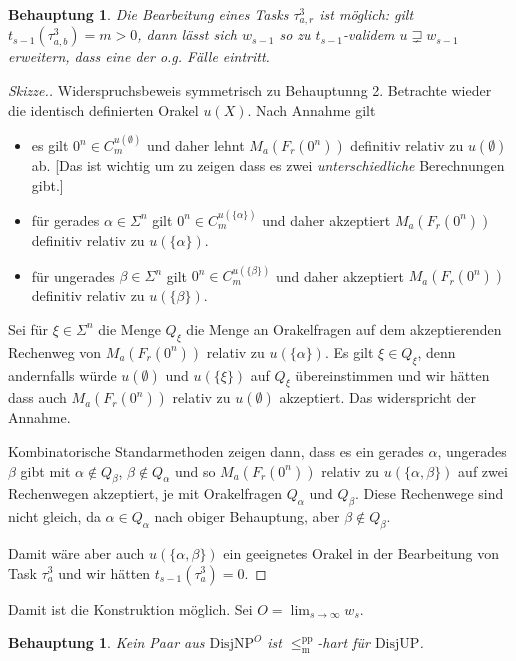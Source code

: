 \documentclass[nofonts]{uebung}
\newtheorem{claim}[theorem]{Behauptung}
\def\DisjNP{\ensuremath{\mathrm{DisjNP}}}
\def\DisjUP{\ensuremath{\mathrm{DisjUP}}}
\def\leqmpp{\ensuremath{\leq_\mathrm{m}^\mathrm{pp}}}
\begin{document}
\begin{claim}
    Die Bearbeitung eines Tasks $\tau^3_{a,r}$ ist möglich: gilt $t_{s-1}(\tau^3_{a,b})=m>0$, dann lässt sich $w_{s-1}$ so zu $t_{s-1}$-validem $u\sqsupsetneq w_{s-1}$ erweitern, dass eine der o.g. Fälle eintritt.
\end{claim}
\begin{proof}[Skizze.]
    Widerspruchsbeweis symmetrisch zu Behauptunng 2. Betrachte wieder die identisch definierten Orakel $u(X)$.
    Nach Annahme gilt
    \begin{itemize}
        \item es gilt $0^n\in C_m^{u(\emptyset)}$ und daher lehnt $M_a(F_r(0^n))$ definitiv relativ zu $u(\emptyset)$ ab. [Das ist wichtig um zu zeigen dass es zwei \emph{unterschiedliche} Berechnungen gibt.]
        \item für gerades $\alpha\in \Sigma^n$ gilt $0^n\in C_m^{u(\{\alpha\})}$ und daher akzeptiert $M_a(F_r(0^n))$ definitiv relativ zu $u(\{\alpha\})$.
        \item für ungerades $\beta\in \Sigma^n$ gilt $0^n\in C_m^{u(\{\beta\})}$ und daher akzeptiert $M_a(F_r(0^n))$ definitiv relativ zu $u(\{\beta\})$.
    \end{itemize}
    Sei für $\xi\in\Sigma^n$ die Menge $Q_\xi$ die Menge an Orakelfragen auf dem akzeptierenden Rechenweg von $M_a(F_r(0^n))$ relativ zu $u(\{\alpha\})$.
    Es gilt $\xi\in Q_\xi$, denn andernfalls würde $u(\emptyset)$ und $u(\{\xi\})$ auf $Q_\xi$ übereinstimmen und wir hätten dass auch $M_a(F_r(0^n))$ relativ zu $u(\emptyset)$ akzeptiert. Das widerspricht der Annahme.

    Kombinatorische Standarmethoden zeigen dann, dass es ein gerades $\alpha$, ungerades $\beta$ gibt mit $\alpha\not\in Q_\beta$, $\beta\not\in Q_\alpha$ und so $M_a(F_r(0^n))$ relativ zu $u(\{\alpha,\beta\})$ auf zwei Rechenwegen akzeptiert, je mit Orakelfragen $Q_\alpha$ und $Q_\beta$. Diese Rechenwege sind nicht gleich, da $\alpha\in Q_\alpha$ nach obiger Behauptung, aber $\beta\not\in Q_\beta$.

    Damit wäre aber auch $u(\{\alpha,\beta\})$ ein geeignetes Orakel in der Bearbeitung von Task $\tau^3_{a}$ und wir hätten $t_{s-1}(\tau^3_{a})=0$.
\end{proof}

Damit ist die Konstruktion möglich. Sei $O=\lim_{s\to\infty} w_s$.

\begin{claim}
    Kein Paar aus $\DisjNP^O$ ist $\leqmpp$-hart für $\DisjUP$.
\end{claim}
\end{document}
